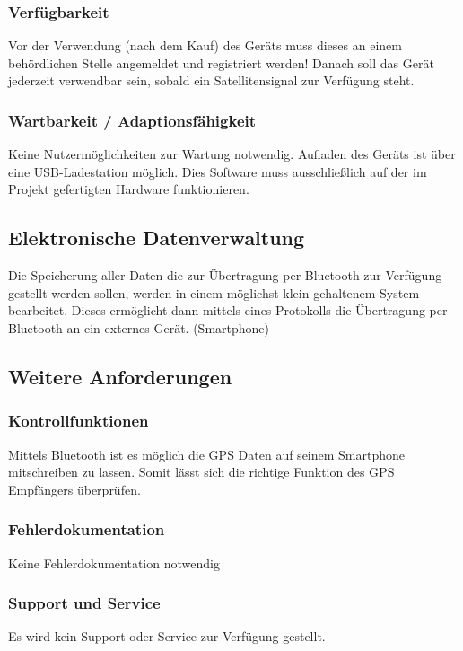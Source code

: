\subsubsection{Verfügbarkeit}
Vor der Verwendung (nach dem Kauf) des Geräts muss dieses an einem behördlichen Stelle angemeldet und 
registriert werden!
Danach soll das Gerät jederzeit verwendbar sein, sobald ein Satellitensignal zur Verfügung steht.
\subsubsection{Wartbarkeit / Adaptionsfähigkeit}
Keine Nutzermöglichkeiten zur Wartung notwendig.
Aufladen des Geräts ist über eine USB-Ladestation möglich.
Dies Software muss ausschließlich auf der im Projekt gefertigten Hardware funktionieren.

\subsection{Elektronische Datenverwaltung}
Die Speicherung aller Daten die zur Übertragung per Bluetooth zur Verfügung gestellt werden sollen, werden in 
einem möglichst klein gehaltenem System bearbeitet. Dieses ermöglicht dann mittels eines Protokolls die Übertragung per Bluetooth an ein externes Gerät. (Smartphone)

\subsection{Weitere Anforderungen}
\subsubsection{Kontrollfunktionen}
Mittels Bluetooth ist es möglich die GPS Daten auf seinem Smartphone mitschreiben zu lassen.
Somit lässt sich die richtige Funktion des GPS Empfängers überprüfen.
\subsubsection{Fehlerdokumentation}
Keine Fehlerdokumentation notwendig
\subsubsection {Support und Service}
Es wird kein Support oder Service zur Verfügung gestellt.

\newpage

